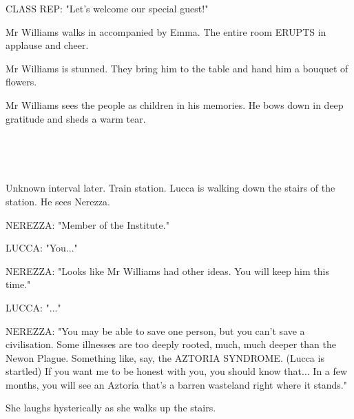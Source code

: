 \documentclass[11pt]{article}
\begin{document}
CLASS REP: "Let's welcome our special guest!"

Mr Williams walks in accompanied by Emma.
The entire room ERUPTS in applause and cheer.

Mr Williams is stunned.
They bring him to the table and hand him a bouquet of flowers.

Mr Williams sees the people as children in his memories.
He bows down in deep gratitude and sheds a warm tear.

\ 

\ 

Unknown interval later.
Train station.
Lucca is walking down the stairs of the station.
He sees Nerezza. 

NEREZZA: "Member of the Institute."

LUCCA: "You..."

NEREZZA: "Looks like Mr Williams had other ideas.
You will keep him this time."

LUCCA: "..."

NEREZZA: "You may be able to save one person, but you can't save a civilisation.
Some illnesses are too deeply rooted, much, much deeper than the Newon Plague.
Something like, say, the AZTORIA SYNDROME. (Lucca is startled)
If you want me to be honest with you, you should know that...
In a few months, you will see an Aztoria that's a barren wasteland right where it stands."

She laughs hysterically as she walks up the stairs.
\end{document}
